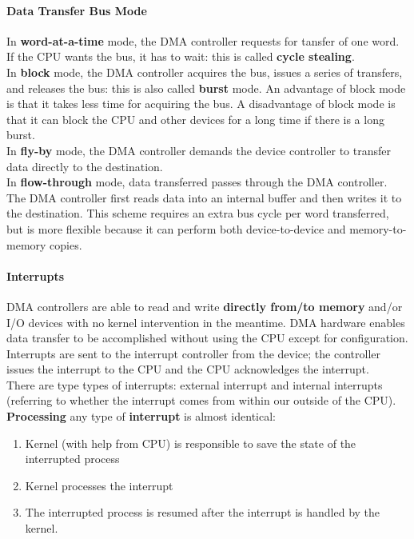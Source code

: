 \documentclass{article}
\newcommand{\bold}[1]{\textbf{#1}}
\begin{document}
\paragraph{Data Transfer Bus Mode}

In \bold{word-at-a-time} mode, the DMA controller requests for tansfer of one word. If the CPU wants the bus, it has to wait: this is called \bold{cycle stealing}. \\ 

In \bold{block} mode, the DMA controller acquires the bus, issues a series of transfers, and releases the bus: this is also called \bold{burst} mode. An advantage of block mode is that it takes less time for acquiring the bus. A disadvantage of block mode is that it can block the CPU and other devices for a long time if there is a long burst. \\ 

In \bold{fly-by} mode, the DMA controller demands the device controller to transfer data directly to the destination. \\

In \bold{flow-through} mode, data transferred passes through the DMA controller. The DMA controller first reads data into an internal buffer and then writes it to the destination. This scheme requires an extra bus cycle per word transferred, but is more flexible because it can perform both device-to-device and memory-to-memory copies. \\

\paragraph{Interrupts}

DMA controllers are able to read and write \bold{directly from/to memory} and/or I/O devices with no kernel intervention in the meantime. DMA hardware enables data transfer to be accomplished without using the CPU except for configuration. Interrupts are sent to the interrupt controller from the device; the controller issues the interrupt to the CPU and the CPU acknowledges the interrupt. \\ 

There are type types of interrupts: external interrupt and internal interrupts (referring to whether the interrupt comes from within our outside of the CPU). \bold{Processing} any type of \bold{interrupt} is almost identical: 

\begin{enumerate}
    \item Kernel (with help from CPU) is responsible to save the state of the interrupted process
    \item Kernel processes the interrupt
    \item The interrupted process is resumed after the interrupt is handled by the kernel. 
\end{enumerate}
\end{document}
